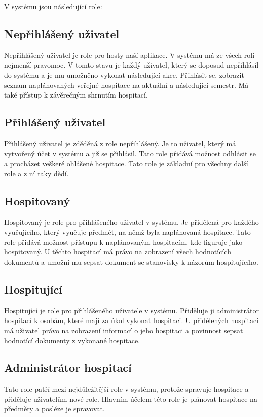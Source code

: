 V systému jsou následující role:

\subsection{Nepřihlášený uživatel}
Nepřihlášený uživatel je role pro hosty naší aplikace. V systému má ze všech rolí nejmenší pravomoc. V tomto stavu je každý uživatel, který se doposud nepřihlásil do systému a je mu umožněno vykonat následující akce. Přihlásit se, zobrazit seznam naplánovaných veřejné hospitace na aktuální a následující semestr. Má také přístup k závěrečným shrnutím hospitací.

\subsection{Přihlášený uživatel}
Přihlášený uživatel je zděděná z role nepřihlášený. Je to uživatel, který má vytvořený účet v systému a již se přihlásil. Tato role přidává možnost odhlásit se a procházet veškeré ohlášené hospitace. Tato role je základní pro všechny další role a z ní taky dědí.

\subsection{Hospitovaný}
Hospitovaný je role pro přihlášeného uživatel v systému. Je přidělená pro každého vyučujícího, který vyučuje předmět, na němž byla naplánovaná hospitace. Tato role přidává možnost přístupu k naplánovaným hospitacím, kde figuruje jako hospitovaný. U těchto hospitací má právo na zobrazení všech hodnotících dokumentů a umožní mu sepsat dokument se stanovisky k názorům hospitujícího.

\subsection{Hospitující}
Hospitující je role pro přihlášeného uživatele v systému. Přiděluje ji administrátor hospitací k osobám, které mají za úkol vykonat hospitaci. U přidělených hospitací má uživatel právo na zobrazení informací o jeho hospitaci a povinnost sepsat hodnotící dokumenty z vykonané hospitace.

\subsection{Administrátor hospitací}
Tato role patří mezi nejdůležitější role v systému, protože spravuje hospitace a přiděluje uživatelům nové role. Hlavním účelem této role je plánovat hospitace na předměty a posléze je spravovat.   


